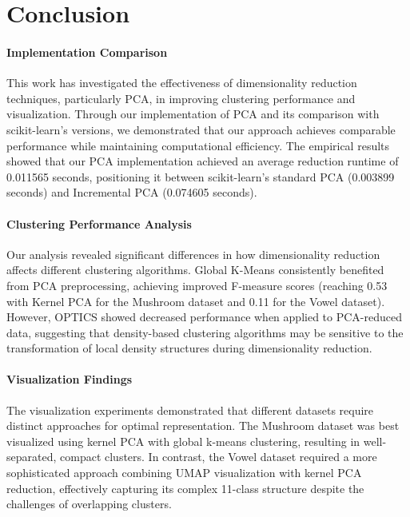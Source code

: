 \section{Conclusion}
\label{sec:conclusion}

\paragraph{Implementation Comparison}
This work has investigated the effectiveness of dimensionality reduction techniques, particularly PCA, in improving clustering performance and visualization. Through our implementation of PCA and its comparison with scikit-learn's versions, we demonstrated that our approach achieves comparable performance while maintaining computational efficiency. The empirical results showed that our PCA implementation achieved an average reduction runtime of 0.011565 seconds, positioning it between scikit-learn's standard PCA (0.003899 seconds) and Incremental PCA (0.074605 seconds).

\paragraph{Clustering Performance Analysis}
Our analysis revealed significant differences in how dimensionality reduction affects different clustering algorithms. Global K-Means consistently benefited from PCA preprocessing, achieving improved F-measure scores (reaching 0.53 with Kernel PCA for the Mushroom dataset and 0.11 for the Vowel dataset). However, OPTICS showed decreased performance when applied to PCA-reduced data, suggesting that density-based clustering algorithms may be sensitive to the transformation of local density structures during dimensionality reduction.

\paragraph{Visualization Findings}
The visualization experiments demonstrated that different datasets require distinct approaches for optimal representation. The Mushroom dataset was best visualized using kernel PCA with global k-means clustering, resulting in well-separated, compact clusters. In contrast, the Vowel dataset required a more sophisticated approach combining UMAP visualization with kernel PCA reduction, effectively capturing its complex 11-class structure despite the challenges of overlapping clusters.

